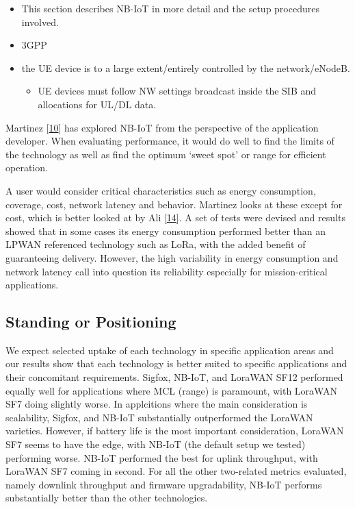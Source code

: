 \documentclass[]{article}
\providecommand{\tightlist}{%
  \setlength{\itemsep}{0pt}\setlength{\parskip}{0pt}}
\begin{document}
\begin{itemize}
\tightlist
\item
  This section describes NB-IoT in more detail and the setup procedures
  involved.
\item
  3GPP
\item
  the UE device is to a large extent/entirely controlled by the
  network/eNodeB.

  \begin{itemize}
  \tightlist
  \item
    UE devices must follow NW settings broadcast inside the SIB and
    allocations for UL/DL data.
  \end{itemize}
\end{itemize}

Martinez {[}\protect\hyperlink{ref-Martinez2019}{10}{]} has explored
NB-IoT from the perspective of the application developer. When
evaluating performance, it would do well to find the limits of the
technology as well as find the optimum `sweet spot' or range for
efficient operation.

A user would consider critical characteristics such as energy
consumption, coverage, cost, network latency and behavior. Martinez
looks at these except for cost, which is better looked at by Ali
{[}\protect\hyperlink{ref-Ali2015}{14}{]}. A set of tests were devised
and results showed that in some cases its energy consumption performed
better than an LPWAN referenced technology such as LoRa, with the added
benefit of guaranteeing delivery. However, the high variability in
energy consumption and network latency call into question its
reliability especially for mission-critical applications.

\hypertarget{lit_standing}{%
\subsection{Standing or Positioning}\label{lit_standing}}

We expect selected uptake of each technology in specific application
areas and our results show that each technology is better suited to
specific applications and their concomitant requirements. Sigfox,
NB-IoT, and LoraWAN SF12 performed equally well for applications where
MCL (range) is paramount, with LoraWAN SF7 doing slightly worse. In
applcitions where the main consideration is scalability, Sigfox, and
NB-IoT substantially outperformed the LoraWAN varieties. However, if
battery life is the most important consideration, LoraWAN SF7 seems to
have the edge, with NB-IoT (the default setup we tested) performing
worse. NB-IoT performed the best for uplink throughput, with LoraWAN SF7
coming in second. For all the other two-related metrics evaluated,
namely downlink throughput and firmware upgradability, NB-IoT performs
substantially better than the other technologies.
\end{document}
